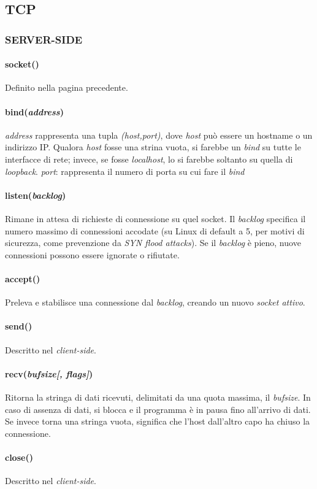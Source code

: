 \subsection{TCP}
\begin{minipage}[t]{0.45\textwidth}
    \subsubsection{SERVER-SIDE}
    \paragraph{socket()}
    Definito nella pagina precedente.

    \paragraph{bind(\textit{address})}
    \textit{address} rappresenta una tupla \textit{(host,port)}, dove \textit{host} può essere un hostname o un indirizzo IP. Qualora \textit{host} fosse una strina vuota, si farebbe un \textit{bind} su tutte le interfacce di rete; invece, se fosse \textit{localhost}, lo si farebbe soltanto su quella di \textit{loopback}.
    \textit{port}: rappresenta il numero di porta su cui fare il \textit{bind}
	
    \paragraph{listen(\textit{backlog})}
    Rimane in attesa di richieste di connessione su quel socket. Il \textit{backlog} specifica il numero massimo di connessioni accodate (su Linux di default a 5, per motivi di sicurezza, come prevenzione da \textit{SYN flood attacks}). Se il \textit{backlog} è pieno, nuove connessioni possono essere ignorate o rifiutate.

    \paragraph{accept()}
    Preleva e stabilisce una connessione dal \textit{backlog}, creando un nuovo \textit{socket attivo}.

    \paragraph{send()}
    Descritto nel \textit{client-side}.

    \paragraph{recv(\textit{bufsize[, flags]})}
    Ritorna la stringa di dati ricevuti, delimitati da una quota massima, il \textit{bufsize}. In caso di assenza di dati, si blocca e il programma è in pausa fino all'arrivo di dati. Se invece torna una stringa vuota, significa che l'host dall'altro capo ha chiuso la connessione.
    \paragraph{close()}
    Descritto nel \textit{client-side}.
\end{minipage}
